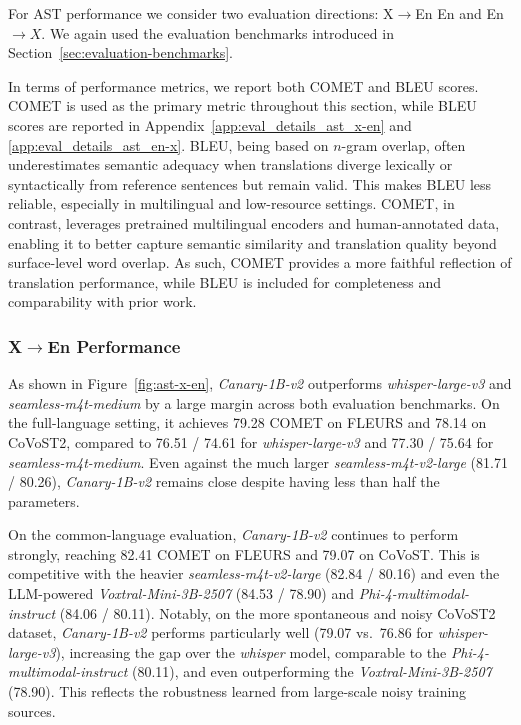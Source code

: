 For AST performance we consider two evaluation directions: X$\to$En En and En $\rightarrow X$. We again used the evaluation benchmarks introduced in Section~\ref{sec:evaluation-benchmarks}.

In terms of performance metrics, we report both COMET and BLEU\cite{papineni2002bleu} scores. COMET is used as the primary metric throughout this section, while BLEU scores are reported in Appendix~\ref{app:eval_details_ast_x-en} and \ref{app:eval_details_ast_en-x}. BLEU, being based on $n$-gram overlap, often underestimates semantic adequacy when translations diverge lexically or syntactically from reference sentences but remain valid. This makes BLEU less reliable, especially in multilingual and low-resource settings. COMET, in contrast, leverages pretrained multilingual encoders and human-annotated data, enabling it to better capture semantic similarity and translation quality beyond surface-level word overlap. As such, COMET provides a more faithful reflection of translation performance, while BLEU is included for completeness and comparability with prior work.

\subsubsection{\texorpdfstring{X$\to$En Performance}{X→En Performance}}

As shown in Figure~\ref{fig:ast-x-en}, \emph{Canary-1B-v2} outperforms \emph{whisper-large-v3} and \emph{seamless-m4t-medium} by a large margin across both evaluation benchmarks. On the full-language setting, it achieves 79.28 COMET on FLEURS and 78.14 on CoVoST2, compared to 76.51 / 74.61 for \emph{whisper-large-v3} and 77.30 / 75.64 for \emph{seamless-m4t-medium}. Even against the much larger \emph{seamless-m4t-v2-large} (81.71 / 80.26), \emph{Canary-1B-v2} remains close despite having less than half the parameters.  

On the common-language evaluation, \emph{Canary-1B-v2} continues to perform strongly, reaching 82.41 COMET on FLEURS and 79.07 on CoVoST. This is competitive with the heavier \emph{seamless-m4t-v2-large} (82.84 / 80.16) and even the LLM-powered \emph{Voxtral-Mini-3B-2507} (84.53 / 78.90) and \emph{Phi-4-multimodal-instruct} (84.06 / 80.11). Notably, on the more spontaneous and noisy CoVoST2 dataset, \emph{Canary-1B-v2} performs particularly well (79.07 vs.\ 76.86 for \emph{whisper-large-v3}), increasing the gap over the \emph{whisper} model, comparable to the \emph{Phi-4-multimodal-instruct} (80.11), and even outperforming the \emph{Voxtral-Mini-3B-2507} (78.90). This reflects the robustness learned from large-scale noisy training sources.    



